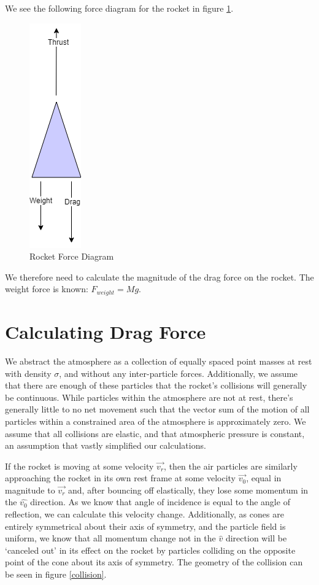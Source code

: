 \documentclass[]{article}
\begin{document}
We see the following force diagram for the rocket in figure \ref{forces}.

\begin{figure}[h]
	\begin{center}
		\caption{Rocket Force Diagram}
		\label{forces}
		\includegraphics[scale=0.5]{forces.png}
	\end{center}
\end{figure}


We therefore need to calculate the magnitude of the drag force on the rocket. The weight force is known: $F_{weight} = Mg$.


\section{Calculating Drag Force}

We abstract the atmosphere as a collection of equally spaced point masses at rest with density $\sigma$, and without any inter-particle forces. Additionally, we assume that there are enough of these particles that the rocket's collisions will generally be continuous. While particles within the atmosphere are not at rest, there's generally little to no net movement such that the vector sum of the motion of all particles within a constrained area of the atmosphere is approximately zero. We assume that all collisions are elastic, and that atmospheric pressure is constant, an assumption that vastly simplified our calculations.


If the rocket is moving at some velocity $\vec{v_{r}}$, then the air particles are similarly approaching the rocket in its own rest frame at some velocity $\vec{v_0}$, equal in magnitude to $\vec{v_{r}}$ and, after bouncing off elastically, they lose some momentum in the $\hat{v_0}$ direction. As we know that angle of incidence is equal to the angle of reflection, we can calculate this velocity change. Additionally, as cones are entirely symmetrical about their axis of symmetry, and the particle field is uniform, we know that all momentum change not in the $\hat{v}$ direction will be `canceled out' in its effect on the rocket by particles colliding on the opposite point of the cone about its axis of symmetry. The geometry of the collision can be seen in figure \ref{collision}.
\end{document}
